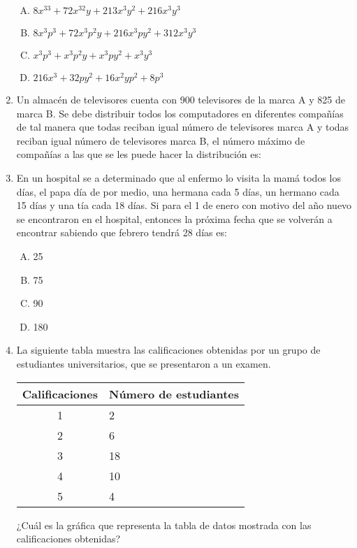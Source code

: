 \begin{enumerate}
\begin{enumerate}[(A)]
\item $8x^{33}+72x^{32}y+213x^3y^2+216x^3y^3$
\item $8x^3p^3+72x^3p^2y+216x^3py^2+312x^3y^3$
\item $x^3p^3+x^3p^2y+x^3py^2+x^3y^3$
\item $216x^3+32py^2+16x^2yp^2+8p^3$
\end{enumerate}

\item Un almacén de televisores cuenta con 900 televisores de la marca A y 825 de marca B. Se debe distribuir todos los computadores en diferentes compañías de tal manera que todas reciban igual número de televisores marca A y todas reciban igual número de televisores marca B, el número máximo de compañías a las que se les puede hacer la distribución es:\label{vic-15}

\item En un hospital se a determinado que al enfermo lo visita la mamá todos los días, el papa día de por medio, una hermana cada 5 días, un hermano cada 15 días y una tía cada 18 días. Si para el 1 de enero con motivo del año nuevo se encontraron en el hospital, entonces la próxima fecha que se volverán a encontrar sabiendo que febrero tendrá 28 días es: \label{vic-16}

\begin{enumerate}[(A)]
\item 25
\item 75
\item 90
\item 180
\end{enumerate}

\item La siguiente tabla muestra las calificaciones obtenidas por un grupo de estudiantes universitarios, que se presentaron a un examen. \label{vic-17}


\begin{center}
\begin{tabular}[c]{|c|p{3cm}|}
\hline 
Calificaciones & Número de estudiantes  \\ 
\hline \hline
1 & 2	 \\ 
2 & 6 \\  
3 & 18 \\  
4 & 10 \\  
5 & 4 \\ 
\hline 
\end{tabular} 

\end{center}
¿Cuál es la gráfica que representa  la tabla de datos mostrada con  las calificaciones obtenidas?


\end{enumerate}
